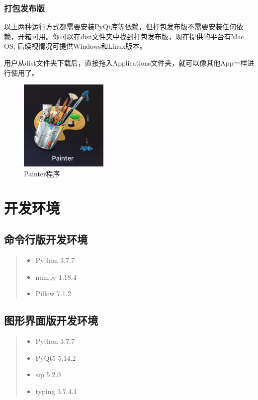 \documentclass[11pt, a4paper, UTF8]{ctexart}
\begin{document}
\subsubsection{打包发布版}
以上两种运行方式都需要安装PyQt库等依赖，但打包发布版不需要安装任何依赖，开箱可用。你可以在dist文件夹中找到打包发布版，现在提供的平台有Mac OS, 后续视情况可提供Windows和Linux版本。

用户从dist文件夹下载后，直接拖入Applications文件夹，就可以像其他App一样进行使用了。

\begin{figure}[H]
    \centering
    \includegraphics[scale=0.5]{dist.png}
    \caption{Painter程序}
\end{figure}


\section{开发环境}

\subsection{命令行版开发环境}

    \begin{quote}

        \begin{itemize}
            \item Python 3.7.7
            \item numpy 1.18.4
            \item Pillow 7.1.2
        \end{itemize}

    \end{quote}

\subsection{图形界面版开发环境}

    \begin{quote}

        \begin{itemize}
            \item Python 3.7.7
            \item PyQt5 5.14.2
            \item sip 5.2.0
            \item typing 3.7.4.1
        \end{itemize}

    \end{quote}    
\end{document}
